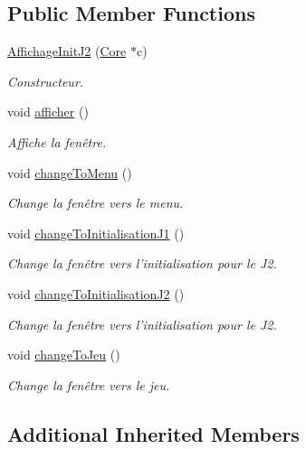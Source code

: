 \subsection*{Public Member Functions}
\begin{DoxyCompactItemize}
\item 
\hyperlink{classAffichageInitJ2_a8f9a34591f3e24cc990cccb66334bb35}{Affichage\+Init\+J2} (\hyperlink{classCore}{Core} $\ast$c)
\begin{DoxyCompactList}\small\item\em Constructeur. \end{DoxyCompactList}\item 
void \hyperlink{classAffichageInitJ2_a4b5dbe3833780c14aaaf946a7542e085}{afficher} ()
\begin{DoxyCompactList}\small\item\em Affiche la fenêtre. \end{DoxyCompactList}\item 
void \hyperlink{classAffichageInitJ2_a7266e6ce2188930080dc3ede1322d14d}{change\+To\+Menu} ()
\begin{DoxyCompactList}\small\item\em Change la fenêtre vers le menu. \end{DoxyCompactList}\item 
void \hyperlink{classAffichageInitJ2_a355056fd45cd18a199801eaf20181edc}{change\+To\+Initialisation\+J1} ()
\begin{DoxyCompactList}\small\item\em Change la fenêtre vers l'initialisation pour le J2. \end{DoxyCompactList}\item 
void \hyperlink{classAffichageInitJ2_a7f861d5e94c8ff21aae5b05601678292}{change\+To\+Initialisation\+J2} ()
\begin{DoxyCompactList}\small\item\em Change la fenêtre vers l'initialisation pour le J2. \end{DoxyCompactList}\item 
void \hyperlink{classAffichageInitJ2_ab2af503532ad81094f890d887bdb4f23}{change\+To\+Jeu} ()
\begin{DoxyCompactList}\small\item\em Change la fenêtre vers le jeu. \end{DoxyCompactList}\end{DoxyCompactItemize}
\subsection*{Additional Inherited Members}


